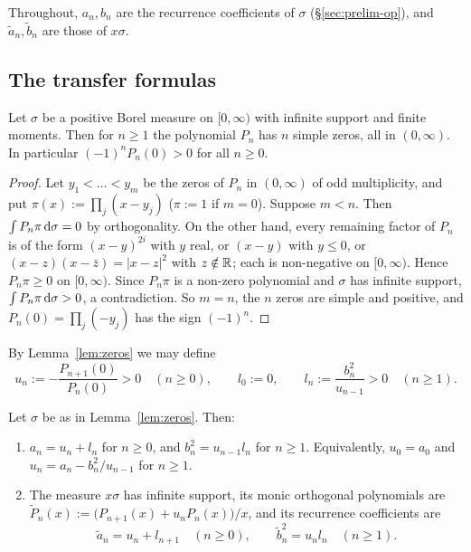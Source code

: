 Throughout, $a_n,b_n$ are the recurrence coefficients of $\sigma$ (\S\ref{sec:prelim-op}), and $\tilde a_n,\tilde b_n$
are those of $x\sigma$.

\subsection{The transfer formulas}

\begin{lemma}\label{lem:zeros}
Let $\sigma$ be a positive Borel measure on $[0,\infty)$ with infinite support and finite moments. Then for $n\ge1$ the
polynomial $P_n$ has $n$ simple zeros, all in $(0,\infty)$. In particular $(-1)^nP_n(0)>0$ for all $n\ge0$.
\end{lemma}

\begin{proof}
Let $y_1<\dots<y_m$ be the zeros of $P_n$ in $(0,\infty)$ of odd multiplicity, and put $\pi(x):=\prod_j(x-y_j)$
($\pi:=1$ if $m=0$). Suppose $m<n$. Then $\int P_n\pi\,\mathrm{d}\sigma=0$ by orthogonality. On the other hand, every
remaining factor of $P_n$ is of the form $(x-y)^{2i}$ with $y$ real, or $(x-y)$ with $y\le0$, or
$(x-z)(x-\bar z)=|x-z|^2$ with $z\notin\mathbb{R}$; each is non-negative on $[0,\infty)$. Hence $P_n\pi\ge0$ on $[0,\infty)$.
Since $P_n\pi$ is a non-zero polynomial and $\sigma$ has infinite support, $\int P_n\pi\,\mathrm{d}\sigma>0$, a contradiction.
So $m=n$, the $n$ zeros are simple and positive, and $P_n(0)=\prod_j(-y_j)$ has the sign $(-1)^n$.
\end{proof}

By Lemma~\ref{lem:zeros} we may define
\[
  u_n:=-\frac{P_{n+1}(0)}{P_n(0)}>0\quad(n\ge0),\qquad l_0:=0,\qquad l_n:=\frac{b_n^2}{u_{n-1}}>0\quad(n\ge1).
\]

\begin{lemma}\label{lem:transfer}
Let $\sigma$ be as in Lemma~\ref{lem:zeros}. Then:
\begin{enumerate}
\item[\textup{(i)}] $a_n=u_n+l_n$ for $n\ge0$, and $b_n^2=u_{n-1}l_n$ for $n\ge1$. Equivalently, $u_0=a_0$ and
  $u_n=a_n-b_n^2/u_{n-1}$ for $n\ge1$.
\item[\textup{(ii)}] The measure $x\sigma$ has infinite support, its monic orthogonal polynomials are
  $\widetilde P_n(x):=\bigl(P_{n+1}(x)+u_nP_n(x)\bigr)/x$, and its recurrence coefficients are
  \begin{equation}\label{eq:transfer}
    \tilde a_n=u_n+l_{n+1}\quad(n\ge0),\qquad \tilde b_n^2=u_nl_n\quad(n\ge1).
  \end{equation}
\end{enumerate}
\end{lemma}

